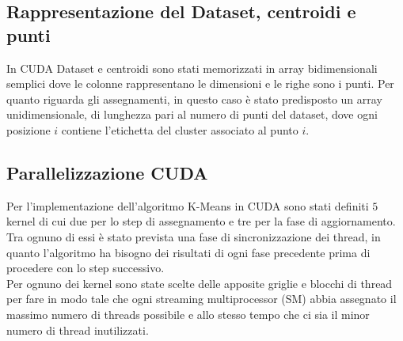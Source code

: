 \documentclass[10pt,twocolumn,letterpaper]{article}
\begin{document}
\subsection{Rappresentazione del Dataset, centroidi e punti}
In CUDA Dataset e centroidi sono stati memorizzati in array bidimensionali semplici dove le colonne rappresentano le dimensioni e le righe sono i punti. Per quanto riguarda gli assegnamenti, in questo caso è stato predisposto un array unidimensionale, di lunghezza pari al numero di punti del dataset, dove ogni posizione $i$ contiene l'etichetta del cluster associato al punto $i$.\\ 
\subsection{Parallelizzazione CUDA}
Per l'implementazione dell'algoritmo K-Means in CUDA sono stati definiti $5$ kernel di cui due per lo step di assegnamento e tre per la fase di aggiornamento. Tra ognuno di essi è stato prevista una fase di sincronizzazione dei thread, in quanto l'algoritmo ha bisogno dei risultati di ogni fase precedente prima di procedere con lo step successivo.\\
Per ognuno dei kernel sono state scelte delle apposite griglie e blocchi di thread per fare in modo tale che ogni streaming multiprocessor (SM) abbia assegnato il massimo numero di threads possibile %
e allo stesso tempo che ci sia il minor numero di thread inutilizzati.%
\end{document}
